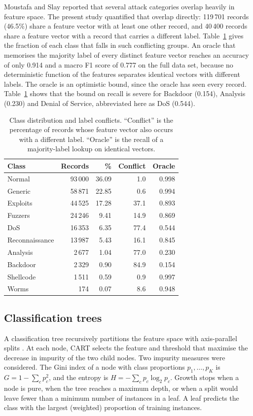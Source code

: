 \documentclass[conference,10pt]{IEEEtran}
\begin{document}
Moustafa and Slay \cite{moustafa2016evaluation} reported that several attack categories overlap heavily in feature space. The present study quantified that overlap directly: 119\,701 records (46.5\%) share a feature vector with at least one other record, and 40\,400 records share a feature vector with a record that carries a different label. Table~\ref{tab:data} gives the fraction of each class that falls in such conflicting groups. An oracle that memorises the majority label of every distinct feature vector reaches an accuracy of only 0.914 and a macro F1 score of 0.777 on the full data set, because no deterministic function of the features separates identical vectors with different labels. The oracle is an optimistic bound, since the oracle has seen every record. Table~\ref{tab:data} shows that the bound on recall is severe for Backdoor (0.154), Analysis (0.230) and Denial of Service, abbreviated here as DoS (0.544).

\begin{table}[t]
\centering
\caption{Class distribution and label conflicts. ``Conflict'' is the percentage of records whose feature vector also occurs with a different label. ``Oracle'' is the recall of a majority-label lookup on identical vectors.}
\label{tab:data}
\begin{tabular}{lrrrr}
\toprule
Class & Records & \% & Conflict & Oracle \\
\midrule
Normal & 93\,000 & 36.09 & 1.0 & 0.998 \\
Generic & 58\,871 & 22.85 & 0.6 & 0.994 \\
Exploits & 44\,525 & 17.28 & 37.1 & 0.893 \\
Fuzzers & 24\,246 & 9.41 & 14.9 & 0.869 \\
DoS & 16\,353 & 6.35 & 77.4 & 0.544 \\
Reconnaissance & 13\,987 & 5.43 & 16.1 & 0.845 \\
Analysis & 2\,677 & 1.04 & 77.0 & 0.230 \\
Backdoor & 2\,329 & 0.90 & 84.9 & 0.154 \\
Shellcode & 1\,511 & 0.59 & 0.9 & 0.997 \\
Worms & 174 & 0.07 & 8.6 & 0.948 \\
\bottomrule
\end{tabular}
\end{table}

\subsection{Classification trees}
A classification tree recursively partitions the feature space with axis-parallel splits \cite{breiman1984cart}. At each node, CART selects the feature and threshold that maximise the decrease in impurity of the two child nodes. Two impurity measures were considered. The Gini index of a node with class proportions $p_1,\dots,p_K$ is $G = 1-\sum_{c} p_c^2$, and the entropy is $H = -\sum_c p_c \log_2 p_c$. Growth stops when a node is pure, when the tree reaches a maximum depth, or when a split would leave fewer than a minimum number of instances in a leaf. A leaf predicts the class with the largest (weighted) proportion of training instances.
\end{document}
